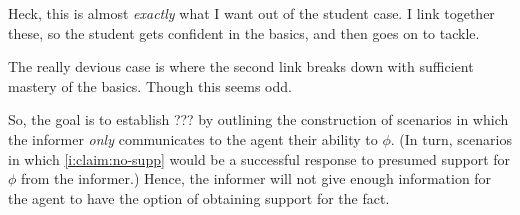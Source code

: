 \documentclass[10pt]{article}
\begin{document}






\newpage


Heck, this is almost \emph{exactly} what I want out of the student case.
I link together these, so the student gets confident in the basics, and then goes on to tackle.

The really devious case is where the second link breaks down with sufficient mastery of the basics.
Though this seems odd.

So, the goal is to establish ??? by outlining the construction of scenarios in which the informer \emph{only} communicates to the agent their ability to \(\phi\).
(In turn, scenarios in which \ref{i:claim:no-supp} would be a successful response to presumed support for \(\phi\) from the informer.)
Hence, the informer will not give enough information for the agent to have the option of obtaining support for the fact.
\end{document}
